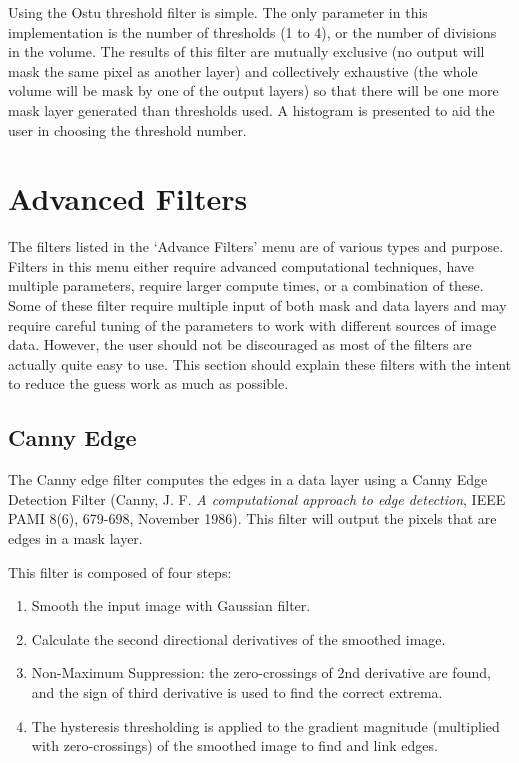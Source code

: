 \documentclass[fleqn,11pt,openany]{book}
\begin{document}
Using the Ostu threshold filter is simple.  The only parameter in this implementation is the number of thresholds (1 to 4), or the number of divisions in the volume.  The results of this filter are mutually exclusive (no output will mask the same pixel as another layer) and collectively exhaustive (the whole volume will be mask by one of the output layers) so that there will be one more mask layer generated than thresholds used.  A histogram is presented to aid the user in choosing the threshold number.

\section{Advanced Filters}

The filters listed in the `Advance Filters' menu are of various types and purpose.  Filters in this menu either require advanced computational techniques, have multiple parameters, require larger compute times, or a combination of these.  Some of these filter require multiple input of both mask and data layers and may require careful tuning of the parameters to work with different sources of image data.  However, the user should not be discouraged as most of the filters are actually quite easy to use.  This section should explain these filters with the intent to reduce the guess work as much as possible. 

\subsection{Canny Edge}


The Canny edge filter computes the edges in a data layer using a Canny Edge Detection Filter (Canny, J. F. \emph{A computational approach to edge detection}, IEEE PAMI 8(6), 679-698, November 1986).  This filter will output the pixels that are edges in a mask layer.  

This filter is composed of four steps:
\begin{enumerate}
\item Smooth the input image with Gaussian filter.
\item Calculate the second directional derivatives of the smoothed image.
\item Non-Maximum Suppression: the zero-crossings of 2nd derivative are found, and the sign of third derivative is used to find the correct extrema.
\item The hysteresis thresholding is applied to the gradient magnitude (multiplied with zero-crossings) of the smoothed image to find and link edges.
\end{enumerate}
\end{document}
